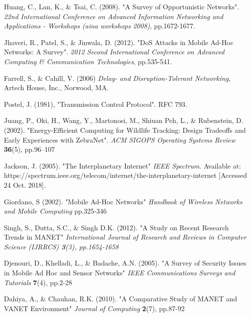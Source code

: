 \documentclass{article}
\begin{document}
\begin{thebibliography}{20}

Huang, C., Lan, K., \& Tsai, C. (2008). 
"A Survey of Opportunistic Networks". 
\textit{22nd International Conference on Advanced Information Networking and Applications - Workshops (aina workshops 2008)}, pp.1672-1677.

Jhaveri, R., Patel, S., \& Jinwala, D. (2012).
"DoS Attacks in Mobile Ad-Hoc Networks: A Survey".
\textit{2012 Second International Conference on Advanced Computing \& Communication Technologies}, pp.535-541.

Farrell, S., \& Cahill, V. (2006) \textit{Delay- and Disruption-Tolerant Networking}, Artech House, Inc., Norwood, MA.

Postel, J. (1981), "Transmission Control Protocol". RFC 793.

Juang, P., Oki, H., Wang, Y., Martonosi, M., Shiuan Peh, L., \& Rubenstein, D. (2002).
"Energy-Efficient Computing for Wildlife Tracking: Design Tradeoffs and Early Experiences with ZebraNet".
\textit{ACM SIGOPS Operating Systems Review} \textbf{36}(5), pp.96–107

Jackson, J. (2005). 
"The Interplanetary Internet"
\textit{IEEE Spectrum}. Available at: https://spectrum.ieee.org/telecom/internet/the-interplanetary-internet [Accessed 24 Oct. 2018].

Giordano, S (2002).
"Mobile Ad-Hoc Networks"
\textit{Handbook of Wireless Networks and Mobile Computing} pp.325-346

Singh, S., Dutta, S.C., \& Singh D.K. (2012). 
"A Study on Recent Research Trends in MANET"
\textit{International Journal of Research and Reviews in Computer Science (IJRRCS) \textbf{3}(3), pp.1654-1658} 

Djenouri, D., Khelladi, L., \& Badache, A.N. (2005).
"A Survey of Security Issues in Mobile Ad Hoc and Sensor Networks"
\textit{IEEE Communications Surveys and Tutorials} \textbf{7}(4), pp.2-28

Dahiya, A., \& Chauhan, R.K. (2010).
"A Comparative Study of MANET and VANET Environment"
\textit{Journal of Computing} \textbf{2}(7), pp.87-92


\end{thebibliography}
\end{document}
